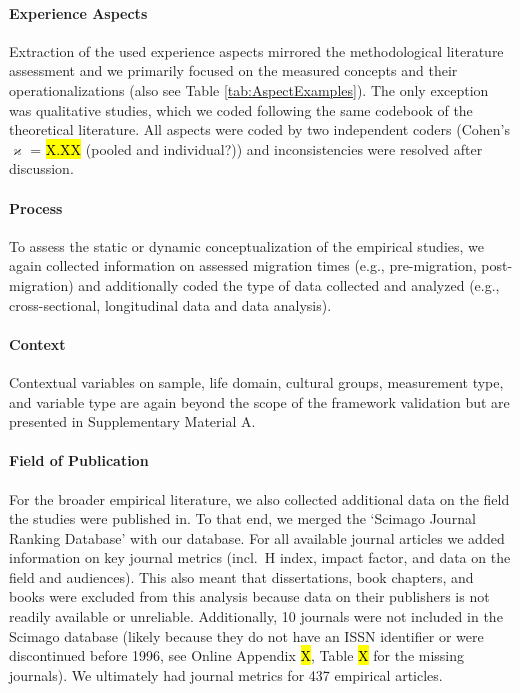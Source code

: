 \paragraph{Experience Aspects}

Extraction of the used experience aspects mirrored the methodological
literature assessment and we primarily focused on the measured concepts
and their operationalizations (also see Table \ref{tab:AspectExamples}).
The only exception was qualitative studies, which we coded following the
same codebook of the theoretical literature. All aspects were coded by
two independent coders (Cohen's \(\varkappa\) = \hl{X.XX} (pooled and
individual?)) and inconsistencies were resolved after discussion.

\paragraph{Process}

To assess the static or dynamic conceptualization of the empirical
studies, we again collected information on assessed migration times
(e.g., pre-migration, post-migration) and additionally coded the type of
data collected and analyzed (e.g., cross-sectional, longitudinal data
and data analysis).

\paragraph{Context}

Contextual variables on sample, life domain, cultural groups,
measurement type, and variable type are again beyond the scope of the
framework validation but are presented in Supplementary Material A.

\paragraph{Field of Publication}

For the broader empirical literature, we also collected additional data
on the field the studies were published in. To that end, we merged the
`Scimago Journal Ranking Database' \citep{SCImago2020} with our
database. For all available journal articles we added information on key
journal metrics (incl.~H index, impact factor, and data on the field and
audiences). This also meant that dissertations, book chapters, and books
were excluded from this analysis because data on their publishers is not
readily available or unreliable. Additionally, 10 journals were not
included in the Scimago database (likely because they do not have an
ISSN identifier or were discontinued before 1996, see Online Appendix
\hl{X}, Table \hl{X} for the missing journals). We ultimately had
journal metrics for 437 empirical articles.

